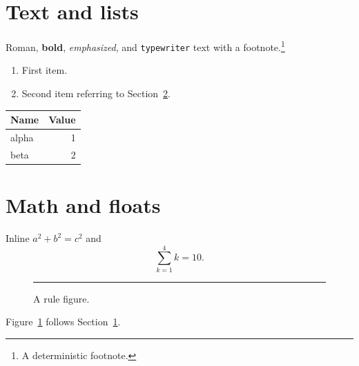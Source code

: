 \documentclass{article}
\begin{document}
\tableofcontents
\section{Text and lists}\label{sec:text}
Roman, \textbf{bold}, \emph{emphasized}, and \texttt{typewriter} text with a
footnote.\footnote{A deterministic footnote.}
\begin{enumerate}
  \item First item.
  \item Second item referring to Section~\ref{sec:math}.
\end{enumerate}
\begin{tabular}{l|r}
Name & Value \\ \hline
alpha & 1 \\
beta & 2
\end{tabular}
\section{Math and floats}\label{sec:math}
Inline $a^2+b^2=c^2$ and
\[
  \sum_{k=1}^{4} k = 10.
\]
\begin{figure}[ht]
  \centering\rule{2cm}{1cm}
  \caption{A rule figure.}\label{fig:rule}
\end{figure}
Figure~\ref{fig:rule} follows Section~\ref{sec:text}.
\end{document}
